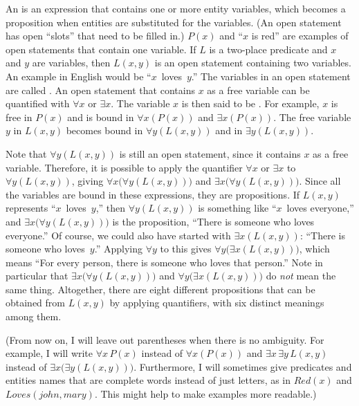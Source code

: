 An  is an expression that contains one or more entity
variables, which becomes a proposition when entities are substituted
for the variables.  (An open statement has open ``slots'' that need to
be filled in.)  $P(x)$ and ``$x$ is red'' are examples of open 
statements that contain one variable.  If $L$ is a two-place predicate
and $x$ and $y$ are variables, then $L(x,y)$ is an open statement
containing two variables.  An example in English would be
``$x$~loves~$y$.''  The variables in an open statement are called 
.  An open statement that contains $x$ as a free
variable can be quantified with $\forall x$ or $\exists x$.
The variable $x$ is then said to be .  For example,
$x$ is free in $P(x)$ and is bound in $\forall x(P(x))$ and
$\exists x(P(x))$.  The free variable $y$ in $L(x,y)$ becomes
bound in $\forall y(L(x,y))$ and in $\exists y(L(x,y))$.

Note that $\forall y(L(x,y))$ is still an open statement, since
it contains $x$ as a free variable.
Therefore, it is possible to
apply the quantifier $\forall x$ or $\exists x$ to $\forall y(L(x,y))$,
giving $\forall x\big(\forall y(L(x,y))\big)$ and
$\exists x\big(\forall y(L(x,y))\big)$.  Since all the variables are
bound in these expressions, they are propositions.  If $L(x,y)$ represents
``$x$~loves~$y$,'' then $\forall y(L(x,y))$ is something like ``$x$~loves
everyone,''  and $\exists x\big(\forall y(L(x,y))\big)$ is the
proposition, ``There is someone who loves everyone.''  Of course, we
could also have started with $\exists x(L(x,y))$: ``There is someone
who loves~$y$.''  Applying $\forall y$ to this gives 
$\forall y\big(\exists x(L(x,y))\big)$,
which means ``For every person, there is someone who loves that person.''
Note in particular that $\exists x\big(\forall y(L(x,y))\big)$ and
$\forall y\big(\exists x(L(x,y))\big)$ do \emph{not} mean the same thing.
Altogether, there are eight different propositions that can
be obtained from $L(x,y)$ by applying quantifiers, with six distinct
meanings among them.

(From now on, I will leave out parentheses when there is no ambiguity.
For example, I will write $\forall x\, P(x)$ instead of $\forall x(P(x))$
and $\exists x\,\exists y\,L(x,y)$ instead of
$\exists x\big(\exists y(L(x,y))\big)$.  Furthermore, I will
sometimes give predicates and entities names that are complete words
instead of just letters, as in  $Red(x)$ and $Loves(john,mary)$.
This might help to make examples more readable.)

